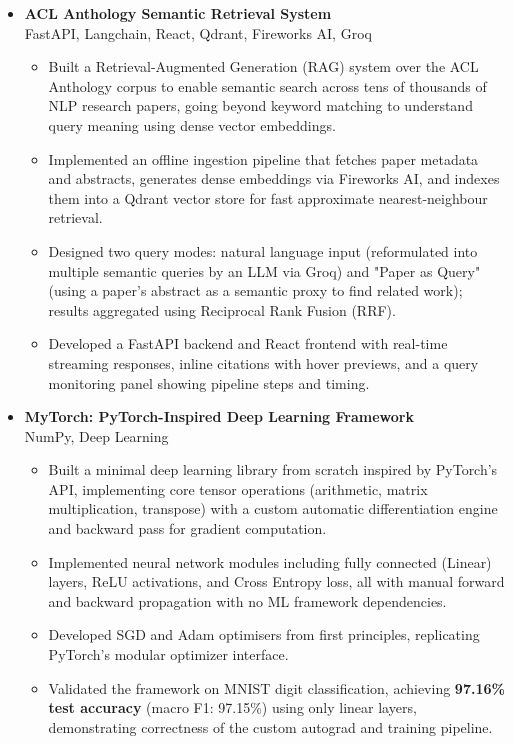 \documentclass[a4paper,11pt]{article}
\newcommand{\cvitem}[1]{\item\small{#1}}
\newcommand{\cvproject}[2]{
  \vspace{2pt}
  \textbf{#1}\\
  \small{#2}\vspace{-4pt}
}
\newenvironment{cvitemlist}
  {\begin{itemize}[leftmargin=0.4cm, topsep=1pt, itemsep=0pt, parsep=0pt, label=\textbullet]}
  {\end{itemize}}
\newenvironment{cvsection}
  {\begin{itemize}[leftmargin=0cm, label={}, topsep=0pt, itemsep=-2pt]}
  {\end{itemize}}
\begin{document}
\begin{cvsection}
  \item
  \cvproject
    {ACL Anthology Semantic Retrieval System \href{https://github.com/nnayz/acl-anthology-rag}{\faGithub}}
    {FastAPI, Langchain, React, Qdrant, Fireworks AI, Groq}
  \begin{cvitemlist}
    \cvitem{Built a Retrieval-Augmented Generation (RAG) system over the ACL Anthology corpus to enable semantic search across tens of thousands of NLP research papers, going beyond keyword matching to understand query meaning using dense vector embeddings.}
    \cvitem{Implemented an offline ingestion pipeline that fetches paper metadata and abstracts, generates dense embeddings via Fireworks AI, and indexes them into a Qdrant vector store for fast approximate nearest-neighbour retrieval.}
    \cvitem{Designed two query modes: natural language input (reformulated into multiple semantic queries by an LLM via Groq) and "Paper as Query" (using a paper's abstract as a semantic proxy to find related work); results aggregated using Reciprocal Rank Fusion (RRF).}
    \cvitem{Developed a FastAPI backend and React frontend with real-time streaming responses, inline citations with hover previews, and a query monitoring panel showing pipeline steps and timing.}
  \end{cvitemlist}

  \item
  \cvproject
    {MyTorch: PyTorch-Inspired Deep Learning Framework \href{https://github.com/nnayz/mytorch}{\faGithub}}
    {NumPy, Deep Learning}
  \begin{cvitemlist}
    \cvitem{Built a minimal deep learning library from scratch inspired by PyTorch's API, implementing core tensor operations (arithmetic, matrix multiplication, transpose) with a custom automatic differentiation engine and backward pass for gradient computation.}
    \cvitem{Implemented neural network modules including fully connected (Linear) layers, ReLU activations, and Cross Entropy loss, all with manual forward and backward propagation with no ML framework dependencies.}
    \cvitem{Developed SGD and Adam optimisers from first principles, replicating PyTorch's modular optimizer interface.}
    \cvitem{Validated the framework on MNIST digit classification, achieving \textbf{97.16\% test accuracy} (macro F1: 97.15\%) using only linear layers, demonstrating correctness of the custom autograd and training pipeline.}
  \end{cvitemlist}
  

\end{cvsection}
\end{document}
